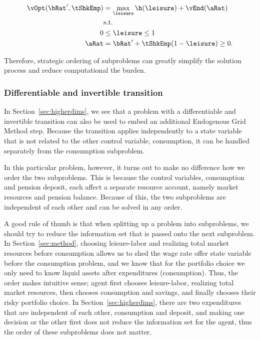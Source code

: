 \documentclass[\econtexRoot/SequentialEGM]{subfiles}
\begin{document}
\begin{equation}
    \begin{split}
        \vOpt(\bRat', \tShkEmp) & = \max_{\leisure} \h(\leisure) + \vEnd(\aRat) \\
        & \text{s.t.} \\
        0 & \le \leisure \le 1 \\
        \aRat & = \bRat' + \tShkEmp(1 - \leisure) \ge 0.
    \end{split}
\end{equation}

Therefore, strategic ordering of subproblems can greatly simplify the solution process and reduce computational the burden.

\subsubsection{Differentiable and invertible transition}

In Section~\ref{sec:higherdims}, we see that a problem with a differentiable and invertible transition can also be used to embed an additional Endogenous Grid Method step. Because the transition applies independently to a state variable that is not related to the other control variable, consumption, it can be handled separately from the consumption subproblem.


In this particular problem, however, it turns out to make no difference how we order the two subproblems. This is because the control variables, consumption and pension deposit, each affect a separate resource account, namely market resources and pension balance. Because of this, the two subproblems are independent of each other and can be solved in any order.

A good rule of thumb is that when splitting up a problem into subproblems, we should try to reduce the information set that is passed onto the next subproblem. In Section~\ref{sec:method}, choosing leisure-labor and realizing total market resources before consumption allows us to shed the wage rate offer state variable before the consumption problem, and we know that for the portfolio choice we only need to know liquid assets after expenditures (consumption). Thus, the order makes intuitive sense; agent first chooses leisure-labor, realizing total market resources, then chooses consumption and savings, and finally chooses their risky portfolio choice. In Section~\ref{sec:higherdims}, there are two expenditures that are independent of each other, consumption and deposit, and making one decision or the other first does not reduce the information set for the agent, thus the order of these subproblems does not matter.
\end{document}
